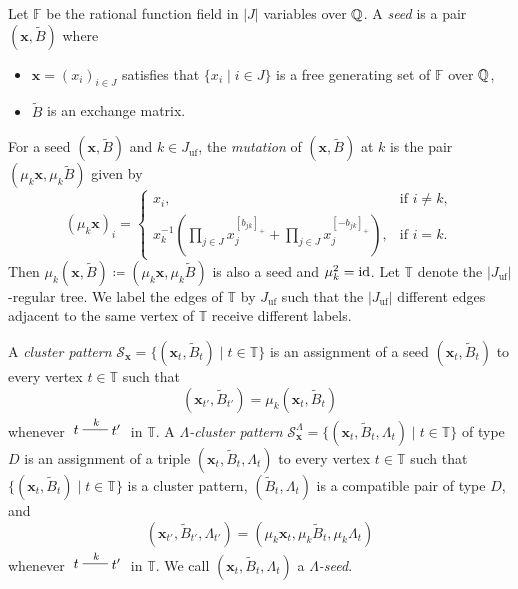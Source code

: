 Let $\mathbb{F}$ be the rational function field
in $|J|$ variables over $\mathbb{Q}$.
A \emph{seed} is a pair $(\mathbf{x}, \widetilde{B})$ where
\begin{itemize}
    \item $\mathbf{x} = (x_i)_{i \in J}$ satisfies that
    $\{x_i \mid i \in J\}$ is a free generating set
    of $\mathbb{F}$ over $\mathbb{Q}$,
    \item $\widetilde{B}$ is an exchange matrix.
\end{itemize}
For a seed $(\mathbf{x}, \widetilde{B})$ and $k \in J_{\mathrm{uf}}$,
the \emph{mutation} of $(\mathbf{x}, \widetilde{B})$ at $k$
is the pair $(\mu_k\mathbf{x}, \mu_k\widetilde{B})$ given by
\[
(\mu_k\mathbf{x})_i =
\begin{cases}
    x_i, & \text{if $i \neq k$}, \\
    x_k^{-1}\left(
    \displaystyle\prod_{j \in J}x_j^{[b_{jk}]_+}
    + \displaystyle\prod_{j \in J}x_j^{[-b_{jk}]_+}
    \right), & \text{if $i = k$}.
\end{cases}
\]
Then
$\mu_k(\mathbf{x}, \widetilde{B})
\coloneq (\mu_k\mathbf{x}, \mu_k\widetilde{B})$
is also a seed and $\mu_k^2 = \mathrm{id}$.
Let $\mathbb{T}$ denote the $|J_{\mathrm{uf}}|$-regular tree.
We label the edges of $\mathbb{T}$ by $J_{\mathrm{uf}}$
such that the $|J_{\mathrm{uf}}|$ different edges adjacent to the same vertex
of $\mathbb{T}$ receive different labels.

\begin{Def}
\label{Def : cluster patterns}
A \emph{cluster pattern}
$\mathcal{S}_{\mathbf{x}}
= \{(\mathbf{x}_t, \widetilde{B}_t) \mid t \in \mathbb{T}\}$
is an assignment of a seed $(\mathbf{x}_t, \widetilde{B}_t)$
to every vertex $t \in \mathbb{T}$ such that
\[
(\mathbf{x}_{t'}, \widetilde{B}_{t'})
= \mu_k(\mathbf{x}_t, \widetilde{B}_t)
\]
whenever $\begin{xy}(0,1)*+{t}="A",(10,1)*+{t'}="B",\ar@{-}^k"A";"B" \end{xy}$ in $\mathbb{T}$.
A \emph{$\Lambda$-cluster pattern}
$\mathcal{S}_{\mathbf{x}}^{\Lambda}
= \{(\mathbf{x}_t, \widetilde{B}_t, \Lambda_t)
\mid t \in \mathbb{T}\}$ of type $D$
is an assignment of a triple $(\mathbf{x}_t, \widetilde{B}_t, \Lambda_t)$
to every vertex $t \in \mathbb{T}$ such that
$\{(\mathbf{x}_t, \widetilde{B}_t) \mid t \in \mathbb{T}\}$
is a cluster pattern,
$(\widetilde{B}_t, \Lambda_t)$ is a compatible pair of type $D$, and
\[
(\mathbf{x}_{t'}, \widetilde{B}_{t'}, \Lambda_{t'})
= (\mu_k\mathbf{x}_t, \mu_k\widetilde{B}_t, \mu_k\Lambda_t)
\]
whenever $\begin{xy}(0,1)*+{t}="A",(10,1)*+{t'}="B",\ar@{-}^k"A";"B" \end{xy}$ in $\mathbb{T}$.
We call $(\mathbf{x}_t, \widetilde{B}_t, \Lambda_t)$
a \emph{$\Lambda$-seed}.
\end{Def}

